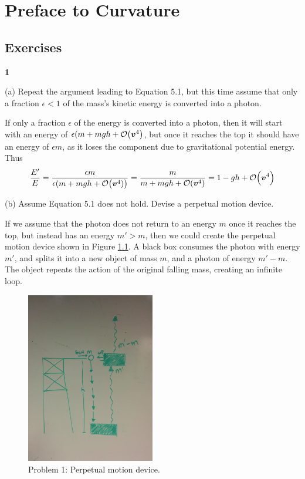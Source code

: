 \documentclass[gr-notes.tex]{subfiles}
\begin{document}
\setcounter{chapter}{4}

\chapter{Preface to Curvature}

\setcounter{section}{7}

\section{Exercises}

\textbf{1}

(a)
Repeat the argument leading to Equation 5.1, but this time assume that only a fraction $\epsilon < 1$ of the mass's kinetic energy is converted into a photon.

If only a fraction $\epsilon$ of the energy is converted into a photon, then it will start with an energy of $\epsilon (m + mgh + \order{\boldsymbol{v}^4}$, but once it reaches the top it should have an energy of $\epsilon m$, as it loses the component due to gravitational potential energy. Thus
%
\begin{displaymath}
  \frac{E'}{E} =
  \frac{\epsilon m}{\epsilon (m + mgh + \order{\boldsymbol{v}^4)}} =
  \frac{m}{m + mgh + \order{\boldsymbol{v}^4}} =
  1 - gh + \order{\boldsymbol{v}^4}
\end{displaymath}

(b)
Assume Equation 5.1 does not hold. Devise a perpetual motion device.

If we assume that the photon does not return to an energy $m$ once it reaches the top, but instead has an energy $m' > m$, then we could create the perpetual motion device shown in Figure \ref{fig:ch5-problem-1b}. A black box consumes the photon with energy $m'$, and splits it into a new object of mass $m$, and a photon of energy $m' - m$. The object repeats the action of the original falling mass, creating an infinite loop.

\begin{figure}[ht]
  \centering
  \includegraphics[width=0.5\textwidth]{img/ch5_problem_1b}
  \caption{Problem 1: Perpetual motion device.}
  \label{fig:ch5-problem-1b}
\end{figure}
\end{document}

